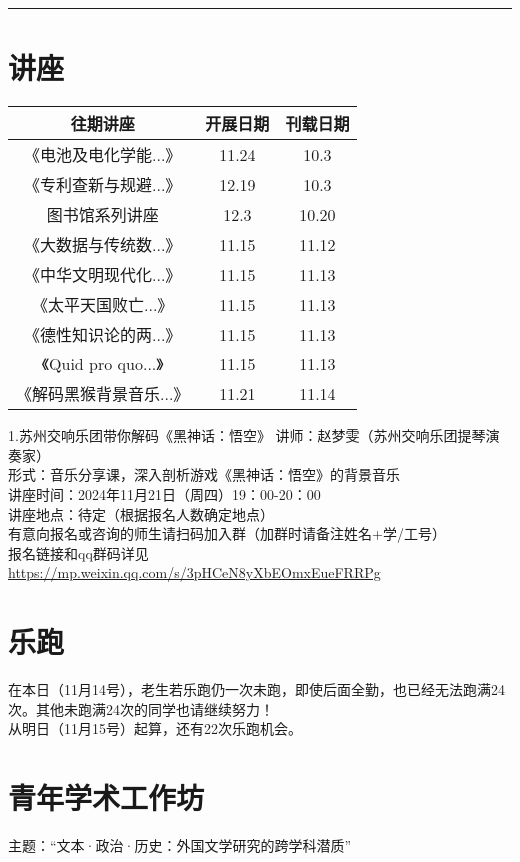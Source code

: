 \documentclass[letterpaper, 12pt]{article}
\begin{document}
\hrule
\pagebreak
\begin{multicols}{2}

\section{讲座}
\begin{tabular}{|c|c|c|}
    \hline
    往期讲座 & 开展日期 & 刊载日期\\
    \hline\hline
    《电池及电化学能...》 & 11.24 & 10.3\\
    《专利查新与规避...》 & 12.19 & 10.3\\
    图书馆系列讲座 & 12.3 & 10.20\\
    《大数据与传统数...》 & 11.15 & 11.12\\
    《中华文明现代化...》 & 11.15 & 11.13\\
    《太平天国败亡...》& 11.15 & 11.13\\
    《德性知识论的两...》 & 11.15 & 11.13\\
    《Quid pro quo...》 & 11.15 & 11.13\\
    《解码黑猴背景音乐...》 & 11.21 & 11.14\\
    
    \hline
\end{tabular}

1.苏州交响乐团带你解码《黑神话：悟空》
讲师：赵梦雯（苏州交响乐团提琴演奏家）\\
形式：音乐分享课，深入剖析游戏《黑神话：悟空》的背景音乐\\
讲座时间：2024年11月21日（周四）19：00-20：00\\
讲座地点：待定（根据报名人数确定地点）\\
有意向报名或咨询的师生请扫码加入群（加群时请备注姓名+学/工号）\\
报名链接和qq群码详见\url{https://mp.weixin.qq.com/s/3pHCeN8yXbEOmxEueFRRPg}


\section{乐跑}
在本日（11月14号），老生若乐跑仍一次未跑，即使后面全勤，也已经无法跑满24次。其他未跑满24次的同学也请继续努力！\\
从明日（11月15号）起算，还有22次乐跑机会。\\

\section{青年学术工作坊}
主题：“文本·政治·历史：外国文学研究的跨学科潜质”


\end{multicols}
\end{document}

